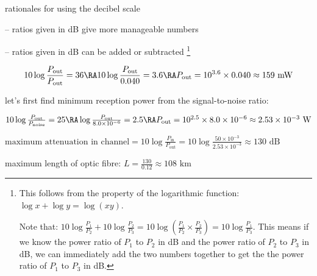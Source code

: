 \cmt rationales for using the decibel scale

\begin{compactitem}
	\item[--] ratios given in dB give more manageable numbers
	
	\item[--] ratios given in dB can be added or subtracted
	\footnote{This follows from the property of the logarithmic function: $\log x + \log y = \log (xy) $. 
		
		Note that: $10\log\frac{P_1}{P_2} + 10\log\frac{P_2}{P_3} = 10\log\left(\frac{P_1}{P_2} \times \frac{P_2}{P_3}\right) = 10\log\frac{P_1}{P_3}$. This means if we know the power ratio of $P_1$ to $P_2$ in dB and the power ratio of $P_2$ to $P_3$ in dB, we can immediately add the two numbers together to get the the power ratio of $P_1$ to $P_3$ in dB.
		
	}
\end{compactitem}





\solc
\begin{equation*}
	10\log\frac{P_\text{out}}{P_\text{out}} = 36 \RA 10\log\frac{P_\text{out}}{0.040}=3.6 \RA P_\text{out} = 10^{3.6} \times 0.040 \approx 159 \text{ mW} 
\end{equation*}


\sol let's first find minimum reception power from the signal-to-noise ratio:

{
	\centering
	
	$10\log\frac{P_\text{out}}{P_\text{noise}} = 25 \RA \log\frac{P_\text{out}}{8.0\times10^{-6}}=2.5 \RA P_\text{out} = 10^{2.5} \times 8.0\times10^{-6} \approx 2.53\times10^{-3} \text{ W} $
	
}

$\text{maximum attenuation in channel} = 10\log\frac{P_\text{in}}{P_\text{out}} = 10\log\frac{50\times10^{-3}}{2.53\times10^{-3}} \approx 130 \text{ dB}$

maximum length of optic fibre: $L = \frac{130}{0.12} \approx 108 \text{ km}$ \eoe
 

